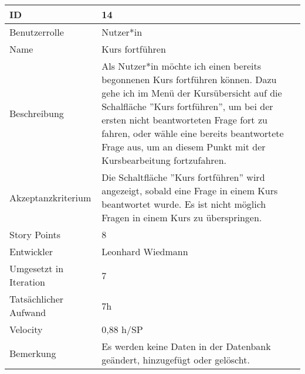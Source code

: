 \begin{tabularx}{\textwidth}{|p{}|X|}
	\hline
	ID & 14 \\
	\hline
	Benutzerrolle & Nutzer*in\\
	\hline
	Name & Kurs fortführen\\
	\hline
	Beschreibung & Als Nutzer*in möchte ich einen bereits begonnenen Kurs fortführen können. Dazu gehe ich im Menü der Kursübersicht auf die Schalfläche ''Kurs fortführen'', um bei der ersten nicht beantworteten Frage fort zu fahren, oder wähle eine bereits beantwortete Frage aus, um an diesem Punkt mit der Kursbearbeitung fortzufahren. \\
	\hline
	Akzeptanzkriterium & Die Schaltfläche ''Kurs fortführen'' wird angezeigt, sobald eine Frage in einem Kurs beantwortet wurde. Es ist nicht möglich Fragen in einem Kurs zu überspringen.\\
	\hline
	Story Points & 8\\
	\hline
	Entwickler & Leonhard Wiedmann\\
	\hline
	Umgesetzt in Iteration & 7 \\
	\hline
	Tatsächlicher Aufwand & 7h \\
	\hline
	Velocity & 0,88 h/SP \\
	\hline
	Bemerkung & Es werden keine Daten in der Datenbank geändert, hinzugefügt oder gelöscht.\\
	\hline
\end{tabularx}
\vspace{20pt}
